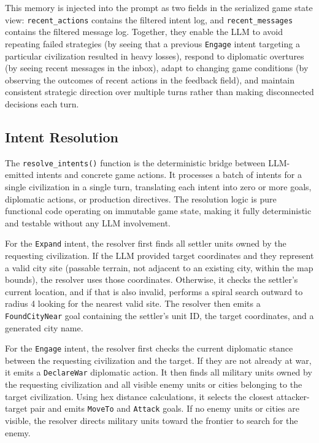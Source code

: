 \documentclass[conference]{IEEEtran}
\begin{document}
This memory is injected into the prompt as two fields in the serialized game state view: \texttt{recent\_actions} contains the filtered intent log, and \texttt{recent\_messages} contains the filtered message log. Together, they enable the LLM to avoid repeating failed strategies (by seeing that a previous \texttt{Engage} intent targeting a particular civilization resulted in heavy losses), respond to diplomatic overtures (by seeing recent messages in the inbox), adapt to changing game conditions (by observing the outcomes of recent actions in the feedback field), and maintain consistent strategic direction over multiple turns rather than making disconnected decisions each turn.

\subsection{Intent Resolution}

The \texttt{resolve\_intents()} function is the deterministic bridge between LLM-emitted intents and concrete game actions. It processes a batch of intents for a single civilization in a single turn, translating each intent into zero or more goals, diplomatic actions, or production directives. The resolution logic is pure functional code operating on immutable game state, making it fully deterministic and testable without any LLM involvement.

For the \texttt{Expand} intent, the resolver first finds all settler units owned by the requesting civilization. If the LLM provided target coordinates and they represent a valid city site (passable terrain, not adjacent to an existing city, within the map bounds), the resolver uses those coordinates. Otherwise, it checks the settler's current location, and if that is also invalid, performs a spiral search outward to radius 4 looking for the nearest valid site. The resolver then emits a \texttt{FoundCityNear} goal containing the settler's unit ID, the target coordinates, and a generated city name.

For the \texttt{Engage} intent, the resolver first checks the current diplomatic stance between the requesting civilization and the target. If they are not already at war, it emits a \texttt{DeclareWar} diplomatic action. It then finds all military units owned by the requesting civilization and all visible enemy units or cities belonging to the target civilization. Using hex distance calculations, it selects the closest attacker-target pair and emits \texttt{MoveTo} and \texttt{Attack} goals. If no enemy units or cities are visible, the resolver directs military units toward the frontier to search for the enemy.
\end{document}
